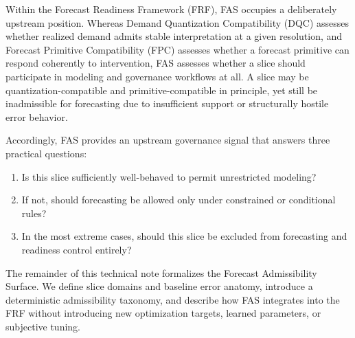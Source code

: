 Within the Forecast Readiness Framework (FRF), FAS occupies a deliberately
upstream position. Whereas Demand Quantization Compatibility (DQC) assesses
whether realized demand admits stable interpretation at a given resolution, and
Forecast Primitive Compatibility (FPC) assesses whether a forecast primitive can
respond coherently to intervention, FAS assesses whether a slice should
participate in modeling and governance workflows at all. A slice may be
quantization-compatible and primitive-compatible in principle, yet still be
inadmissible for forecasting due to insufficient support or structurally hostile
error behavior.

Accordingly, FAS provides an upstream governance signal that answers three
practical questions:
\begin{enumerate}[label=(\roman*)]
  \item Is this slice sufficiently well-behaved to permit unrestricted modeling?
  \item If not, should forecasting be allowed only under constrained or
        conditional rules?
  \item In the most extreme cases, should this slice be excluded from forecasting
        and readiness control entirely?
\end{enumerate}

The remainder of this technical note formalizes the Forecast Admissibility
Surface. We define slice domains and baseline error anatomy, introduce a
deterministic admissibility taxonomy, and describe how FAS integrates into the
FRF without introducing new optimization targets, learned parameters, or
subjective tuning.
